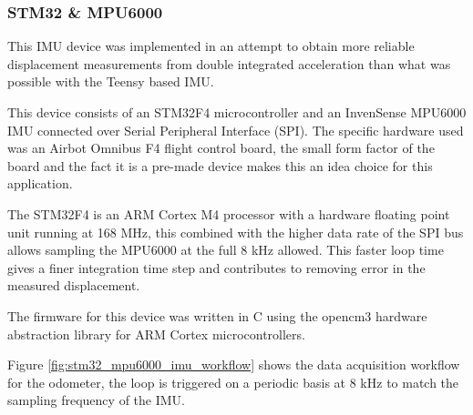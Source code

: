 \documentclass{entcs}
\begin{document}
\subsubsection{STM32 \& MPU6000}

This IMU device was implemented in an attempt to obtain more reliable
displacement measurements from double integrated acceleration than what was
possible with the Teensy based IMU.

This device consists of an STM32F4 microcontroller and an InvenSense MPU6000 IMU
connected over Serial Peripheral Interface (SPI). The specific hardware used was
an Airbot Omnibus F4 flight control board, the small form factor of the board
and the fact it is a pre-made device makes this an idea choice for this
application.

The STM32F4 is an ARM Cortex M4 processor with a hardware floating point unit
running at 168 MHz, this combined with the higher data rate of the SPI bus
allows sampling the MPU6000 at the full 8 kHz allowed. This faster loop time
gives a finer integration time step and contributes to removing error in the
measured displacement.

The firmware for this device was written in C using the opencm3
\cite{libopencm3} hardware abstraction library for ARM Cortex microcontrollers.

Figure \ref{fig:stm32_mpu6000_imu_workflow} shows the data acquisition workflow
for the odometer, the loop is triggered on a periodic basis at 8 kHz to match
the sampling frequency of the IMU.
\end{document}
